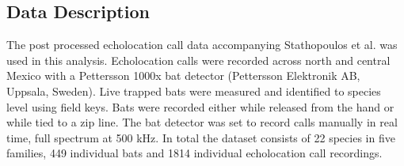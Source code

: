 \documentclass[wsdraft]{ws-rv9x6} %
\begin{document}
\subsection{Data Description}

The post processed echolocation call data accompanying Stathopoulos et al. \cite{stathopoulos2017bat} was used in this analysis. Echolocation calls were recorded across north and central Mexico with a Pettersson 1000x bat detector (Pettersson Elektronik AB, Uppsala, Sweden). Live trapped bats were measured and identified to species level using field keys.\cite{ceballos2005mamiferos} \cite{medellin2sanchez} Bats were recorded either while released from the hand or while tied to a zip line. The bat detector was set to record calls manually in real time, full spectrum at 500 kHz. 
In total the dataset consists of 22 species in five families, 449 individual bats and 1814 individual echolocation call recordings.
\end{document}
